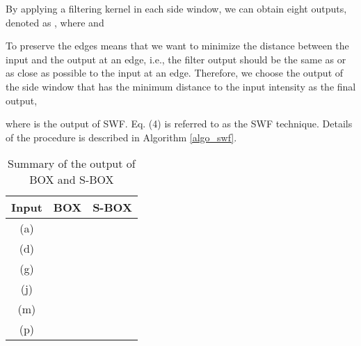 \documentclass[10pt,twocolumn,letterpaper]{article}
\begin{document}
By applying a filtering kernel  in each side window, we can obtain eight outputs, denoted as , where  and 

To preserve the edges means that we want to minimize the distance between the input and the output at an edge, i.e., the filter output should be the same as or as close as possible to the input at an edge. Therefore, we choose the output of the side window that has the minimum  distance to the input intensity as the final output, 

where  is the output of SWF. Eq. (4) is referred to as the SWF technique. Details of the procedure is described in Algorithm \ref{algo_swf}.
\begin{table}[htbp]
	\centering
	\caption{Summary of the output of BOX and S-BOX}
	\begin{tabular}{|c|c|c|}
		\hline
		Input&BOX&S-BOX\\
		\hline
		(a)&&\\
		\hline
		(d)&&\\
		\hline
		(g)&&\\
		\hline
		(j)&&\\
		\hline
		(m)&&\\
		\hline
		(p)&&\\
		\hline
	\end{tabular}
	\label{boxandsbox}
\end{table}
\end{document}
